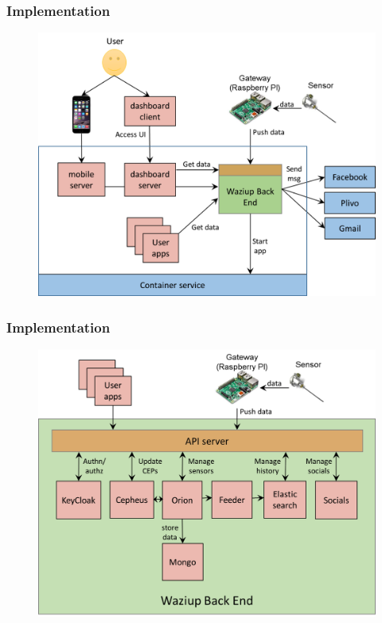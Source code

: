 \documentclass{beamer}
\begin{document}
\begin{frame}
\frametitle{Implementation}

  \begin{figure} 
  \centering  
  \includegraphics[width=.8\linewidth]{figures/CloudEnv.png}   
  \label{fig-implem}  
  \end{figure}

\end{frame}


\begin{frame}
\frametitle{Implementation}
 

  \begin{figure}
  \centering  
  \includegraphics[width=.8\linewidth]{figures/BackEnd.png}   
  \label{fig-implem}  
  \end{figure}
\end{frame}
\end{document}
